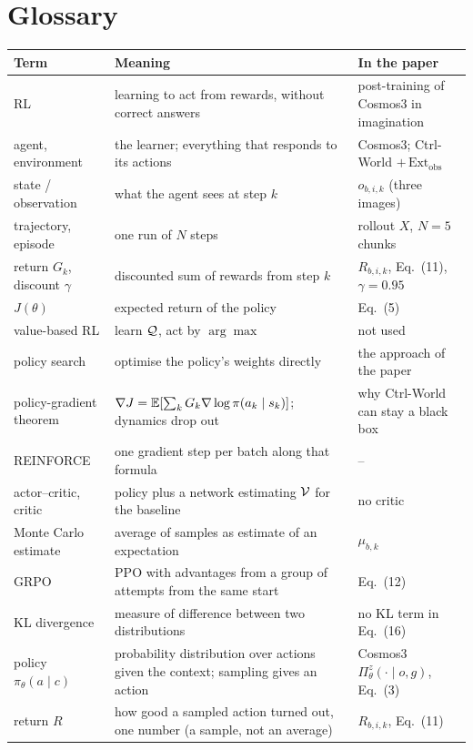 \section*{Glossary}
\begin{center}
\small
\begin{tabularx}{\linewidth}{@{}l Y >{\raggedright\arraybackslash}p{4.2cm}@{}}
\toprule
Term & Meaning & In the paper\\
\midrule
RL & learning to act from rewards, without correct answers & post-training of Cosmos3 in imagination\\
agent, environment & the learner; everything that responds to its actions & Cosmos3; Ctrl-World $+\,\mathrm{Ext}_{\mathrm{obs}}$\\
state / observation & what the agent sees at step $k$ & $o_{b,i,k}$ (three images)\\
trajectory, episode & one run of $N$ steps & rollout $X$, $N=5$ chunks\\
return $G_k$, discount $\gamma$ & discounted sum of rewards from step $k$ & $R_{b,i,k}$, Eq.~(11), $\gamma=0.95$\\
$J(\theta)$ & expected return of the policy & Eq.~(5)\\
value-based RL & learn $\mathcal{Q}$, act by $\arg\max$ & not used\\
policy search & optimise the policy's weights directly & the approach of the paper\\
policy-gradient theorem & $\nabla J=\mathbb{E}[\sum_kG_k\nabla\log\pi(a_k\mid s_k)]$; dynamics drop out & why Ctrl-World can stay a black box\\
REINFORCE & one gradient step per batch along that formula & --\\
actor--critic, critic & policy plus a network estimating $\mathcal{V}$ for the baseline & no critic\\
Monte Carlo estimate & average of samples as estimate of an expectation & $\mu_{b,k}$\\
GRPO & PPO with advantages from a group of attempts from the same start & Eq.~(12)\\
KL divergence & measure of difference between two distributions & no KL term in Eq.~(16)\\
policy $\pi_\theta(a\mid c)$ & probability distribution over actions given the context; sampling gives an action & Cosmos3 $\Pi^z_\theta(\cdot\mid o,g)$, Eq.~(3)\\
return $R$ & how good a sampled action turned out, one number (a sample, not an average) & $R_{b,i,k}$, Eq.~(11)\\

\end{tabularx}
\end{center}
